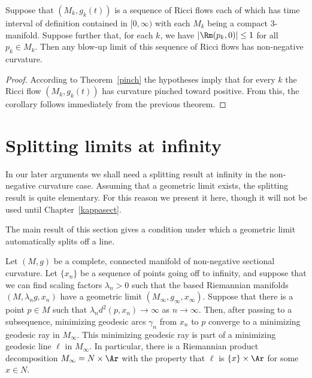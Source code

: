 \begin{corollary}\label{cor:blow-up-limit-nonnegative-curvature-pinched}

Suppose that $(M_k,g_k(t))$ is a sequence of Ricci flows each of which has time
interval of definition contained in $[0,\infty)$ with each $M_k$ being a
compact $3$-manifold. Suppose further that, for each $k$, we have $|\Rm(p_k,0)|\le 1$ for all $p_k\in M_k$. Then any blow-up limit of this sequence
of Ricci flows has non-negative curvature.
\end{corollary}


\begin{proof}
\sketch
{}
According to Theorem~\ref{pinch} the hypotheses imply that for every $k$ the
Ricci flow $(M_k,g_k(t))$ has curvature pinched toward positive. From this, the
corollary follows immediately from the previous theorem.
\end{proof}

\section{Splitting limits at infinity}

In our later arguments we shall need a splitting result at infinity
in the non-negative curvature case. Assuming that a geometric limit
exists, the splitting result is quite elementary. For this reason we
present it here, though it will not be used until
Chapter~\ref{kappasect}.



The main result of this section gives a condition under which a geometric limit
automatically splits off a line.

\begin{theorem}\label{thm:splitting-at-infinity}
\label{topsplit}

Let $(M,g)$ be a complete, connected manifold of non-negative
sectional curvature. Let $\{x_n\}$ be a sequence of points going off
to infinity, and suppose that we can find scaling factors
$\lambda_n>0$ such that the based Riemannian manifolds
$(M,\lambda_ng,x_n)$ have a geometric limit
$(M_\infty,g_\infty,x_\infty)$. Suppose that there is a point $p\in
M$ such that $\lambda_nd^2(p,x_n)\rightarrow \infty$ as
$n\rightarrow\infty$.  Then, after passing to a subsequence,
minimizing geodesic arcs $\gamma_n$ from $x_n$ to $p$ converge to a
minimizing geodesic ray in $M_\infty$. This minimizing geodesic ray
is part of a minimizing geodesic line $\ell$ in $M_\infty$. In
particular, there is a Riemannian product decomposition
$M_\infty=N\times \Ar$ with the property that $\ell$ is $\{x\}\times
\Ar$ for some $x\in N$.
\end{theorem}


